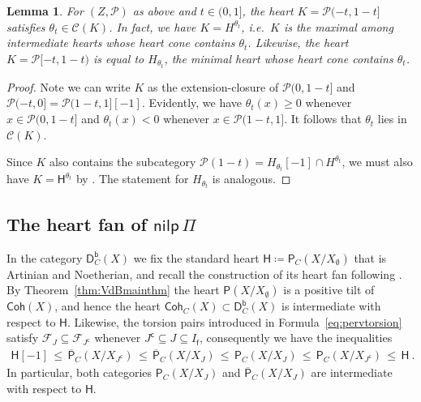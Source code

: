 \documentclass[reqno,a4paper]{amsart}
\newcommand{\calC}{\mathcal{C}}
\newcommand{\calF}{\mathcal{F}}
\newcommand{\calP}{\mathcal{P}}
\newcommand{\sfH}{\mathsf{H}}
\newcommand{\sff}{\mathsf{f}}
\newcommand{\catP}{\mathsf{P}}
\newcommand{\catPC}{\mathsf{P}_{C}}
\newcommand{\barcatPC}{\overline{\mathsf{P}}_{C}}
\newcommand{\nilpPi}{\mathsf{nilp}\, \Pi}
\newcommand{\catCoh}{\mathsf{Coh}}
\newcommand{\catCohC}{\mathsf{Coh}_C}
\newcommand{\catDbC}{\mathsf{D}^\mathsf{b}_C}
\newcommand{\rsv}{X}
\newcommand{\ssv}{X_\emptyset}
\newcommand{\psv}{X_J}
\newcommand{\Jcomp}{{J^\mathsf{c}}}
\theoremstyle{basic-theorem}
\newtheorem{lemma}[theorem]{Lemma}
\numberwithin{equation}{section}
\begin{document}
\begin{lemma}\label{lem:bridgeland-to-king}
	For $(Z,\calP)$ as above and $t\in (0,1]$, the heart $K=\calP(-t,1-t]$ satisfies $\theta_t\in \calC(K)$. In fact, we have $K=H^{\theta_t}$, i.e.\ $K$ is the maximal among intermediate hearts whose heart cone contains $\theta_t$. Likewise, the heart $K=\calP[-t,1-t)$ is equal to $H_{\theta_t}$, the minimal heart whose heart cone contains $\theta_t$.
\end{lemma}

\begin{proof}
	Note we can write $K$ as the extension-closure of $\calP(0,1-t]$ and $\calP(-t,0]=\calP(1-t,1][-1]$. Evidently, we have $\theta_t(x)\geq 0$ whenever $x\in \calP(0,1-t]$ and $\theta_t(x)< 0$ whenever $x\in \calP(1-t,1]$. It follows that $\theta_t$ lies in $\calC(K)$.

	Since $K$ also contains the subcategory $\calP(1-t)=H_{\theta_t}[-1]\cap H^{\theta_t}$, we must also have $K=\sfH^{\theta_t}$ by \cite[Corollary~2.14]{Shimpi_Torsion_pairs}. The statement for $H_{\theta_t}$ is analogous.
\end{proof}

\subsection{The heart fan of $\nilpPi$}

In the category $\catDbC(\rsv)$ we fix the standard heart $\sfH\coloneqq \catPC(\rsv/\ssv)$ that is Artinian and Noetherian, and recall the construction of its heart fan following \cite{Shimpi_Torsion_pairs}. By Theorem~\ref{thm:VdBmainthm} the heart $\catP(\rsv/\ssv)$ is a positive tilt of $\catCoh(\rsv)$, and hence the heart $\catCohC(\rsv)\subset \catDbC(\rsv)$ is intermediate with respect to $\sfH$. Likewise, the torsion pairs introduced in Formula~\eqref{eq:pervtorsion} satisfy $\calF_{J}\subseteq \calF_{\Jcomp}$ whenever $\Jcomp\subseteq J\subseteq I_\sff$, consequently we have the inequalities
\begin{align}
    \sfH[-1] \,\leq\, \barcatPC(\rsv/X_{\Jcomp}) \,\leq\, \barcatPC(\rsv/\psv) \,\leq\, \catPC(\rsv/\psv) \,\leq\, \catPC(\rsv/\rsv_{\Jcomp}) \,\leq\, \sfH\ .
\end{align}
In particular, both categories $\catPC(\rsv/\psv)$ and $\barcatPC(\rsv/\psv)$ are intermediate with respect to $\sfH$.
\end{document}
